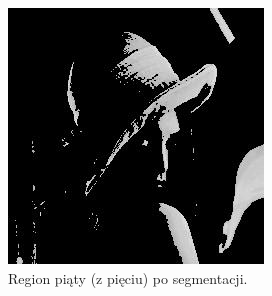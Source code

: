 \documentclass[10pt]{llncs}
\begin{document}
\FloatBarrier

\begin{figure}[h!]
  \centering
  \includegraphics[scale=.8, clip]{img/02_region_05.jpg}
	\caption[]
  {Region piąty (z pięciu) po segmentacji.}
\end{figure}

\FloatBarrier
\end{document}
